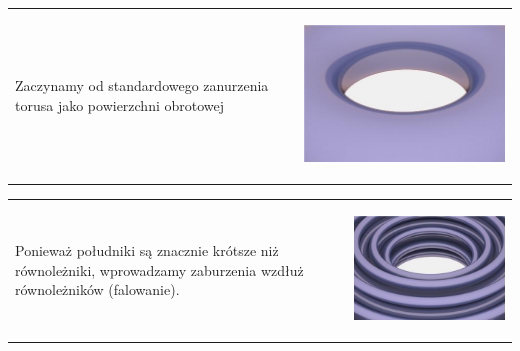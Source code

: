 \begin{frame}[plain]

\begin{tabular}{m{2.5in} m{2in}}
Zaczynamy od standardowego zanurzenia torusa jako powierzchni obrotowej
&\begin{center}
\includegraphics[scale=0.5]{./pictures/C1-torus-step1.jpg}
\end{center}\\
\end{tabular}

\begin{tabular}{m{2.5in} m{2in}}
\pause Ponieważ południki są znacznie krótsze niż równoleżniki, wprowadzamy zaburzenia wzdłuż równoleżników (falowanie).
&\begin{center}
\includegraphics[scale=0.5]{./pictures/C1-torus-step2.jpg}
\end{center}\\
\end{tabular}
\end{frame}

